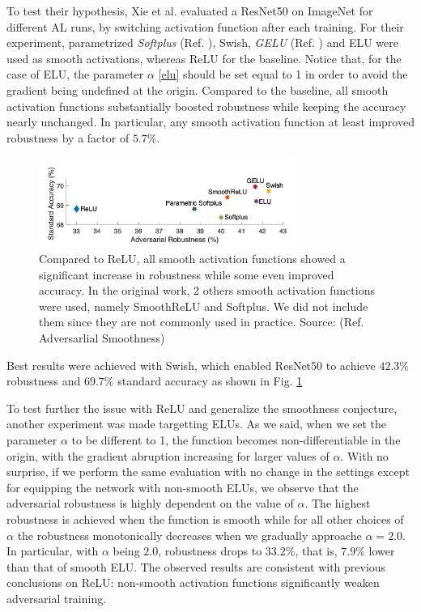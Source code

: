 \documentclass[LaM,binding=0.6cm]{./packages/sapthesis/sapthesis}
\begin{document}
    To test their hypothesis, Xie et al. evaluated a ResNet50 on ImageNet for different AL runs, by switching activation function after each training. For their experiment,
    parametrized \textit{Softplus} (Ref. ), Swish, \textit{GELU} (Ref. ) and ELU were used as smooth activations, whereas ReLU for the baseline. Notice that,
    for the case of ELU, the parameter $\alpha$ \ref{elu} should be set equal to 1 in order to avoid the gradient being undefined at the origin. Compared to the 
    baseline, all smooth activation functions substantially boosted robustness while keeping the accuracy nearly unchanged. In particular, any smooth activation 
    function at least improved robustness by a factor of $5.7\%$. 
    \begin{figure}[t]
        \centering
        \includegraphics[width=0.75\textwidth]{smoothresults}
        \caption{Compared to ReLU, all smooth activation functions showed a significant increase in robustness
        while some even improved accuracy. In the original work, 2 others smooth activation functions were used, namely 
        SmoothReLU and Softplus. We did not include them since they are not commonly used in practice. Source: (Ref. Adversarlial Smoothness)}
        \label{fig:smoothresults}
    \end{figure}
    Best results were achieved with Swish, which enabled
    ResNet50 to achieve $42.3\%$ robustness and $69.7\%$ standard accuracy as shown 
    in Fig. \ref{fig:smoothresults}

    To test further the issue with ReLU and generalize the smoothness conjecture, another 
    experiment was made targetting ELUs. As we said, when we set the parameter $\alpha$ to be different to 
    1, the function becomes non-differentiable in the origin, with the gradient
    abruption increasing for larger values of $\alpha$. With no surprise, if we perform the same evaluation with no change in the settings
    except for equipping the network with non-smooth ELUs,
    we observe that the adversarial robustness is highly dependent on the value of $\alpha$. 
    The highest robustness is achieved when the function is smooth while for all other choices of 
    $\alpha$ the robustness monotonically decreases when we gradually approache $\alpha = 2.0$. 
    In particular, with $\alpha$ being $2.0$, robustness drops to $33.2\%$, that is, $7.9\%$ lower than that of smooth ELU. 
    The observed results are consistent with previous conclusions on ReLU: non-smooth activation functions significantly
    weaken adversarial training.
\end{document}
